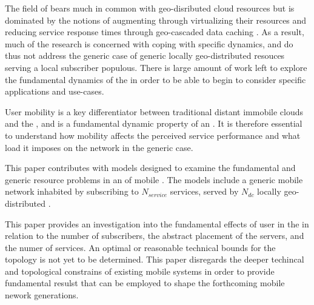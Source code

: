The field of \xcloud bears much in common with geo-disributed cloud resources but is dominated by the notions of augmenting \ues through virtualizing their resources \cite{6563280} and reducing service response times through geo-cascaded data caching \cite{1437087,ericsson_akami}. As a result, much of the research is concerned with coping with specific dynamics, and do thus not address the generic case of generic locally geo-distributed resouces serving a local subscriber populous. There is large amount of work left to explore the fundamental dynamics of the \xcloud in order to be able to begin to consider specific applications and use-cases.

User mobility is a key differentiator between traditional distant immobile clouds and the \xcloud, and is a fundamental dynamic property of an \xcloud. It is therefore essential to understand how \ue mobility affects the perceived service performance and what load it imposes on the network in the generic case.

This paper contributes with models designed to examine the fundamental and generic resource problems in an \xcloud of mobile \ues. The models include a generic mobile network inhabited by \ues subscribing to $N_{service}$ services, served by $N_{dc}$ locally geo-distributed \dcs.

This paper provides an investigation into the fundamental effects of user \ue in the \xcloud in relation to the number of subscribers, the abstract placement of the servers, and the numer of services. An optimal or reasonable technical bounds for the \xcloud topology is not yet to be determined. This paper disregards the deeper techincal and topological constrains of existing mobile systems in order to provide fundamental resulst that can be employed to shape the forthcoming mobile nework generations.
